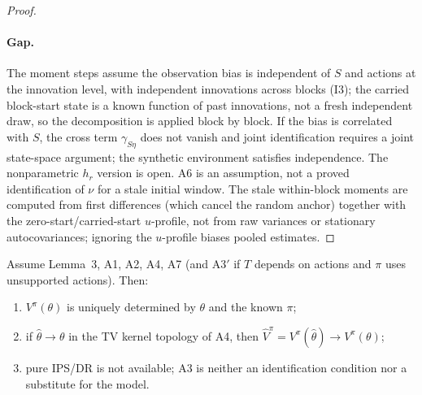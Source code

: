 \begin{proof}
\paragraph{Gap.}
The moment steps assume the observation bias is independent of $S$ and actions
at the innovation level, with independent innovations across blocks (I3); the
carried block-start state is a known function of past innovations, not a fresh
independent draw, so the decomposition is applied block by block.  If the bias
is correlated with $S$, the cross term $\gamma_{S\eta}$ does not vanish and
joint identification requires a joint state-space argument; the synthetic
environment satisfies independence.  The nonparametric $h_r$ version is open.
A6 is an assumption, not a proved identification of $\nu$ for a stale initial
window.  The stale within-block moments are computed from first differences
(which cancel the random anchor) together with the zero-start/carried-start
$u$-profile, not from raw variances or stationary autocovariances; ignoring the
$u$-profile biases pooled estimates.
\end{proof}

\begin{aIlemD}
Assume Lemma~3, A1, A2, A4, A7 (and A3$'$ if $T$ depends on actions and $\pi$
uses unsupported actions).  Then:
\begin{enumerate}
\item $V^\pi(\theta)$ is uniquely determined by $\theta$ and the known $\pi$;
\item if $\hat\theta\to\theta$ in the TV kernel topology of A4, then
$\hat V^\pi=V^\pi(\hat\theta)\to V^\pi(\theta)$;
\item pure IPS/DR is not available; A3 is neither an identification condition
nor a substitute for the model.
\end{enumerate}
\end{aIlemD}


